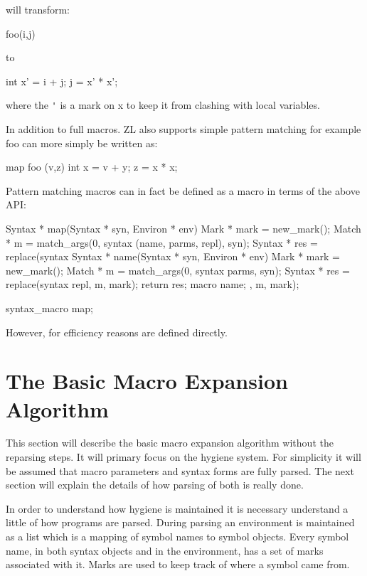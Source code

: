 \documentclass[12pt,english,letterpaper]{article}
\begin{document}
will transform:
\begin{code}
foo(i,j)
\end{code}
to
\begin{code}
int x' = i + j;
j = x' * x';
\end{code}
where the \verb/'/ is a mark on x to keep it from clashing with local variables.

In addition to full macros. ZL also supports simple pattern matching
for example foo can more simply be written as:

\begin{code}
map foo (v,z) {
  int x = v + y; 
  z = x * x;
}
\end{code}

Pattern matching macros can in fact be defined as a macro in terms of
the above API:

\begin{code}
Syntax * map(Syntax * syn, Environ * env) {
  Mark * mark = new_mark();
  Match * m = match_args(0, syntax (name, parms, repl), syn);
  Syntax * res = replace(syntax {
      Syntax * name(Syntax * syn, Environ * env) {
        Mark * mark = new_mark();
        Match * m = match_args(0, syntax parms, syn);
        Syntax * res = replace(syntax repl, m, mark);
        return res;
      }
      macro name;
    }, m, mark);
}

syntax_macro map;
\end{code}

However, for efficiency reasons are defined directly.

\section{The Basic Macro Expansion Algorithm}

This section will describe the basic macro expansion algorithm without
the reparsing steps.  It will primary focus on the hygiene system.  For
simplicity it will be assumed that macro parameters and syntax forms
are fully parsed.  The next section will explain the details of how
parsing of both is really done.

In order to understand how hygiene is maintained it is necessary
understand a little of how programs are parsed.  During parsing an
environment is maintained as a list which is a mapping of symbol names
to symbol objects.  Every symbol name, in both syntax objects and in
the environment, has a set of marks associated with it.  Marks are
used to keep track of where a symbol came from.
\end{document}
